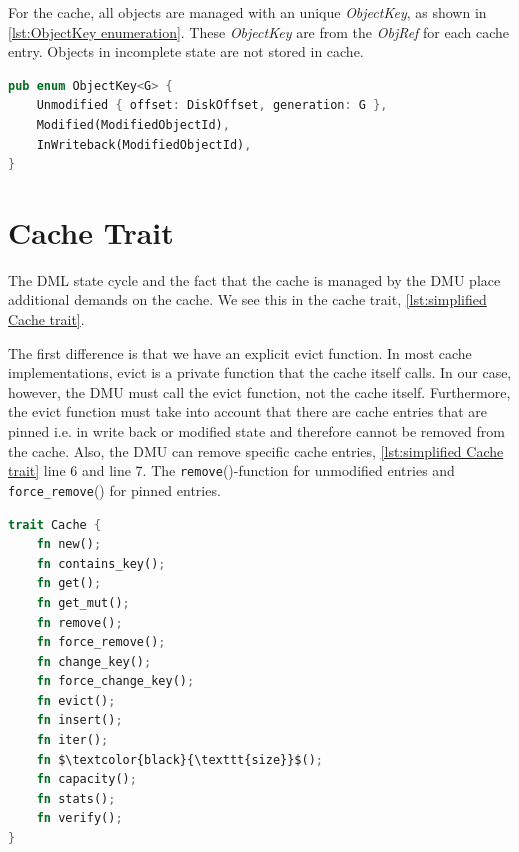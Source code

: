 \documentclass[
	12pt,
	a4paper,
	abstract,
	bibliography=totoc,
	chapterprefix,
	headings=openright,
	numbers=endperiod,
	parskip=half,
	twoside,
]{scrreprt}
\begin{document}
For the cache, all objects are managed with an unique \emph{ObjectKey}, as shown in \cref{lst:ObjectKey enumeration}.
These \emph{ObjectKey} are  from the \emph{ObjRef} for each cache entry.
Objects in incomplete state are not stored in cache.

\bigskip

\begin{lstlisting}[language=Rust,mathescape=true,caption=ObjectKey enumeration,label=lst:ObjectKey enumeration]
pub enum ObjectKey<G> {
    Unmodified { offset: DiskOffset, generation: G },
    Modified(ModifiedObjectId),
    InWriteback(ModifiedObjectId),
}
\end{lstlisting}

\bigskip

\section{Cache Trait}
\label{sec:cache trait}

The DML state cycle and the fact that the cache is managed by the DMU place additional demands on the cache.
We see this in the cache trait, \cref{lst:simplified Cache trait}.

The first difference is that we have an explicit evict function. In most cache implementations, evict is a private function that the cache itself calls.
In our case, however, the DMU must call the evict function, not the cache itself.
Furthermore, the evict function must take into account that there are cache entries that 
are pinned i.e. in write back or modified state and therefore cannot be removed from the cache.
Also, the DMU can remove specific cache entries, \cref{lst:simplified Cache trait} line 6 and line 7.
The \texttt{remove}()-function for unmodified entries and \texttt{force\_remove}() for pinned entries.

\bigskip

\begin{lstlisting}[language=Rust,mathescape=true,caption={simplified Cache trait without type aliases, generics, function parameters and function return types},label=lst:simplified Cache trait]
trait Cache {
    fn new();
    fn contains_key();
    fn get();
    fn get_mut();
    fn remove();
    fn force_remove();
    fn change_key();
    fn force_change_key();
    fn evict();
    fn insert();
    fn iter();
    fn $\textcolor{black}{\texttt{size}}$();
    fn capacity();
    fn stats();
    fn verify();
}
\end{lstlisting}
\end{document}
